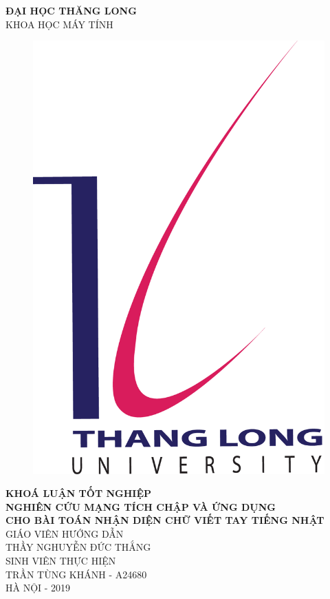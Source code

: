 \begin{titlepage}
\begin{center}
\textbf{ĐẠI HỌC THĂNG LONG}\\
{KHOA HỌC MÁY TÍNH}

\vspace{30mm}

\begin{figure}[htp]
\begin{center}
	\includegraphics[scale=1]{coverpage/image/Logo_ThangLong}
\end{center}
\end{figure}

\textbf{\large KHOÁ LUẬN TỐT NGHIỆP}\\
[0.75cm]

\textbf{\large NGHIÊN CỨU MẠNG TÍCH CHẬP VÀ  ỨNG DỤNG \\ CHO BÀI TOÁN NHẬN DIỆN CHỮ VIẾT TAY TIẾNG NHẬT}\\

\vspace{4cm}
GIÁO VIÊN HƯỚNG DẪN\\
[3mm]
\textsc{\large THẦY NGHUYỄN ĐỨC THẮNG}\\
[1cm]
SINH VIÊN THỰC HIỆN\\
[3mm]
\textsc{\large TRẦN TÙNG KHÁNH - A24680}\\
[4cm]
HÀ NỘI - 2019
\end{center}
\end{titlepage}